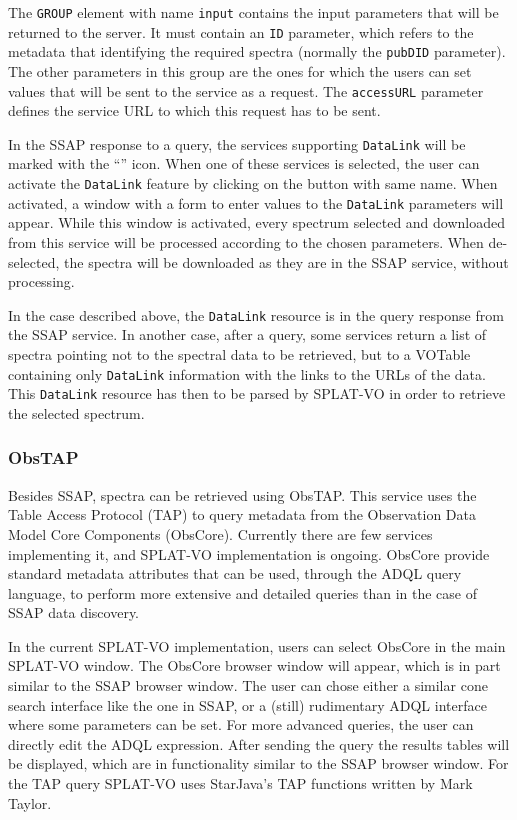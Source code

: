 \documentclass[final,authoryear,5p,times,twocolumn]{elsarticle}
\begin{document}
The \texttt{GROUP} element with name \texttt{input} contains the input
parameters that will be returned to the server.  It must contain an \texttt{ID}
parameter, which refers to the metadata that identifying the required
spectra (normally the \texttt{pubDID} parameter).  The other parameters in
this group are the ones for which the users can set values that will
be sent to the service as a request. The \texttt{accessURL} parameter defines
the service URL to which this request has to be sent.

In the SSAP response to a query, the services supporting \texttt{DataLink} will
be marked with the  ``''  icon. When one of these services is
selected, the user can activate the \texttt{DataLink} feature by clicking on
the button with same name. When activated, a window with a form to
enter values to the \texttt{DataLink} parameters will appear. While this window
is activated, every spectrum selected and downloaded from this service
will be processed according to the chosen parameters. When
de-selected, the spectra will be downloaded as they are in the SSAP
service, without processing.

In the case described above, the \texttt{DataLink} resource is in the query
response from the SSAP service. In another case, after a query, some
services return a list of spectra pointing not to the spectral data to
be retrieved, but to a VOTable containing only \texttt{DataLink} information
with the links to the URLs of the data. This \texttt{DataLink} resource has
then to be parsed by SPLAT-VO in order to retrieve the selected spectrum.

\subsubsection{ObsTAP}

Besides SSAP, spectra can be retrieved using ObsTAP. This service uses
the Table Access Protocol (TAP) to query metadata from the Observation
Data Model Core Components (ObsCore). Currently there are few services
implementing it, and SPLAT-VO implementation is ongoing.  ObsCore
provide standard metadata attributes that can be used, through the
ADQL query language, to perform more extensive and detailed queries
than in the case of SSAP data discovery.

In the current SPLAT-VO implementation, users can select ObsCore in the
main SPLAT-VO window. The ObsCore browser window will appear, which is in
part similar to the SSAP browser window. The user can chose either a
similar cone search interface like the one in SSAP, or a (still)
rudimentary ADQL interface where some parameters can be set. For more
advanced queries, the user can directly edit the ADQL
expression. After sending the query the results tables will be
displayed, which are in functionality similar to the SSAP browser
window. For the TAP query SPLAT-VO uses StarJava's TAP functions written
by Mark Taylor.
\end{document}
